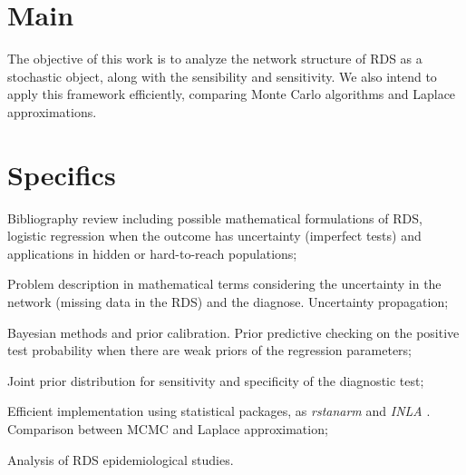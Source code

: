 \section{Main}

The objective of this work is to analyze the network structure of RDS as a
stochastic object, along with the sensibility and sensitivity. We also intend
to apply this framework efficiently, comparing Monte Carlo algorithms and
Laplace approximations.



\section{Specifics}

\begin{alineas}
    \item Bibliography review including possible mathematical formulations of
    RDS, logistic regression when the outcome has uncertainty (imperfect
    tests) and applications in hidden or hard-to-reach populations; 

    \item Problem description in mathematical terms considering the
    uncertainty in the network (missing data in the RDS) and the
    diagnose. Uncertainty propagation; 

    \item Bayesian methods and prior calibration. Prior predictive checking on
    the positive test probability when there are weak priors of the
    regression parameters; 

    \item Joint prior distribution for sensitivity and specificity of the
    diagnostic test;

    \item Efficient implementation using statistical packages, as {\em
    rstanarm} \cite{rstanarm} and {\em INLA} \cite{rue2009approximate}. Comparison between MCMC and Laplace
    approximation; 

    \item Analysis of RDS epidemiological studies.
\end{alineas}